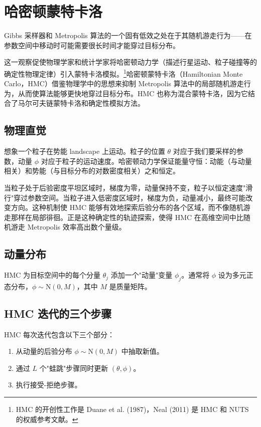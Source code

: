 \section{哈密顿蒙特卡洛}

Gibbs 采样器和 Metropolis 算法的一个固有低效之处在于其随机游走行为——在参数空间中移动时可能需要很长时间才能穿过目标分布。

这一观察促使物理学家和统计学家将哈密顿动力学（描述行星运动、粒子碰撞等的确定性物理定律）引入蒙特卡洛模拟。\footnote{HMC 的开创性工作是 Duane et al. (1987)，Neal (2011) 是 HMC 和 NUTS 的权威参考文献。}哈密顿蒙特卡洛（Hamiltonian Monte Carlo，HMC）借鉴物理学中的思想来抑制 Metropolis 算法中的局部随机游走行为，从而使算法能够更快地穿过目标分布。HMC 也称为混合蒙特卡洛，因为它结合了马尔可夫链蒙特卡洛和确定性模拟方法。

\subsection{物理直觉}

想象一个粒子在势能 landscape 上运动。粒子的位置 $\theta$ 对应于我们要采样的参数，动量 $\phi$ 对应于粒子的运动速度。哈密顿动力学保证能量守恒：动能（与动量相关）和势能（与目标分布的对数密度相关）之和恒定。

当粒子处于后验密度平坦区域时，梯度为零，动量保持不变，粒子以恒定速度"滑行"穿过参数空间。当粒子进入低密度区域时，梯度为负，动量减小，最终可能改变方向。这种机制使 HMC 能够有效地探索后验分布的各个区域，而不像随机游走那样在局部徘徊。正是这种确定性的轨迹探索，使得 HMC 在高维空间中比随机游走 Metropolis 效率高出数个量级。

\subsection{动量分布}

HMC 为目标空间中的每个分量 $\theta_j$ 添加一个"动量"变量 $\phi_j$。通常将 $\phi$ 设为多元正态分布，$\phi \sim \mathrm{N}(0, M)$，其中 $M$ 是质量矩阵。

\subsection{HMC 迭代的三个步骤}

HMC 每次迭代包含以下三个部分：

\begin{enumerate}
  \item 从动量的后验分布 $\phi \sim \mathrm{N}(0, M)$ 中抽取新值。
  \item 通过 $L$ 个"蛙跳"步骤同时更新 $(\theta, \phi)$。
  \item 执行接受-拒绝步骤。
\end{enumerate}

